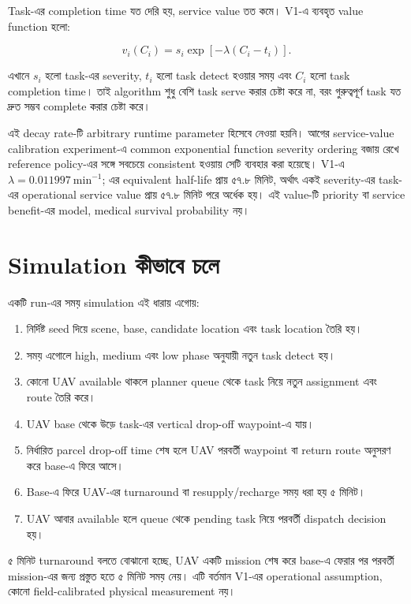 \documentclass[10pt,a4paper]{article}
\begin{document}
Task-এর completion time যত দেরি হয়, service value তত কমে। V1-এ ব্যবহৃত value function হলো:

\begin{equation}
v_i(C_i) = s_i \exp\!\left[-\lambda\left(C_i-t_i\right)\right].
\end{equation}

এখানে $s_i$ হলো task-এর severity, $t_i$ হলো task detect হওয়ার সময় এবং $C_i$ হলো task completion time। তাই algorithm শুধু বেশি task serve করার চেষ্টা করে না, বরং গুরুত্বপূর্ণ task যত দ্রুত সম্ভব complete করার চেষ্টা করে।

এই decay rate-টি arbitrary runtime parameter হিসেবে নেওয়া হয়নি। আগের service-value
calibration experiment-এ common exponential function severity ordering বজায় রেখে
reference policy-এর সঙ্গে সবচেয়ে consistent হওয়ায় সেটি ব্যবহার করা হয়েছে। V1-এ
$\lambda=0.011997\ \text{min}^{-1}$; এর equivalent half-life প্রায় ৫৭.৮ মিনিট,
অর্থাৎ একই severity-এর task-এর operational service value প্রায় ৫৭.৮ মিনিট পরে
অর্ধেক হয়। এই value-টি priority বা service benefit-এর model, medical survival
probability নয়।

\section{Simulation কীভাবে চলে}

একটি run-এর সময় simulation এই ধারায় এগোয়:

\begin{enumerate}
\item নির্দিষ্ট seed দিয়ে scene, base, candidate location এবং task location তৈরি হয়।
\item সময় এগোলে high, medium এবং low phase অনুযায়ী নতুন task detect হয়।
\item কোনো UAV available থাকলে planner queue থেকে task নিয়ে নতুন assignment এবং route তৈরি করে।
\item UAV base থেকে উড়ে task-এর vertical drop-off waypoint-এ যায়।
\item নির্ধারিত parcel drop-off time শেষ হলে UAV পরবর্তী waypoint বা return route অনুসরণ করে base-এ ফিরে আসে।
\item Base-এ ফিরে UAV-এর turnaround বা resupply/recharge সময় ধরা হয় ৫ মিনিট।
\item UAV আবার available হলে queue থেকে pending task নিয়ে পরবর্তী dispatch decision হয়।
\end{enumerate}

৫ মিনিট turnaround বলতে বোঝানো হচ্ছে, UAV একটি mission শেষ করে base-এ ফেরার পর পরবর্তী mission-এর জন্য প্রস্তুত হতে ৫ মিনিট সময় নেয়। এটি বর্তমান V1-এর operational assumption, কোনো field-calibrated physical measurement নয়।
\end{document}
